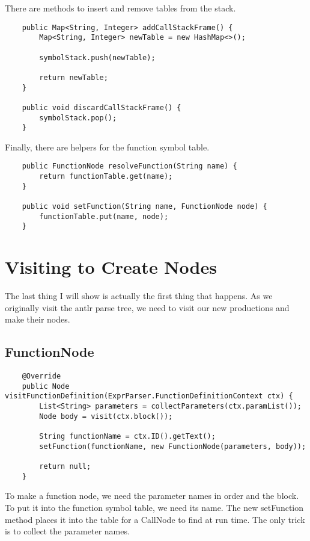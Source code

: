 There are methods to insert and remove tables from the stack.

{\footnotesize
\begin{verbatim}
    public Map<String, Integer> addCallStackFrame() {
        Map<String, Integer> newTable = new HashMap<>();

        symbolStack.push(newTable);

        return newTable;
    }

    public void discardCallStackFrame() {
        symbolStack.pop();
    }
\end{verbatim}
}

Finally, there are helpers for the function symbol table.

{\footnotesize
\begin{verbatim}
    public FunctionNode resolveFunction(String name) {
        return functionTable.get(name);
    }

    public void setFunction(String name, FunctionNode node) {
        functionTable.put(name, node);
    }
\end{verbatim}
}

\section{Visiting to Create Nodes}

The last thing I will show is actually the first thing that happens.
As we originally visit the antlr parse tree, we need to visit our
new productions and make their nodes.

\subsection{FunctionNode}

{\footnotesize
\begin{verbatim}
    @Override
    public Node visitFunctionDefinition(ExprParser.FunctionDefinitionContext ctx) {
        List<String> parameters = collectParameters(ctx.paramList());
        Node body = visit(ctx.block());

        String functionName = ctx.ID().getText();
        setFunction(functionName, new FunctionNode(parameters, body));

        return null;
    }
\end{verbatim}
}

To make a function node, we need the parameter names in order and the
block. To put it into the function symbol table, we need its name.
The new setFunction method places it into the table for a CallNode
to find at run time. The only trick is to collect the parameter names.

